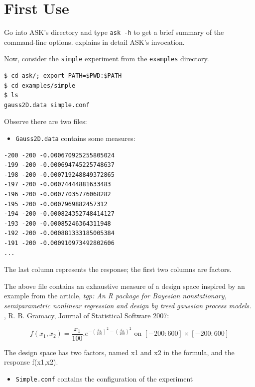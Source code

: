 \section{First Use}

Go into ASK's directory and type \texttt{ask -h} to get a brief summary of the command-line options.
 explains in detail ASK's invocation.

Now, consider the \texttt{simple} experiment from the \texttt{examples} directory.

\begin{verbatim}
$ cd ask/; export PATH=$PWD:$PATH
$ cd examples/simple
$ ls 
gauss2D.data simple.conf
\end{verbatim}

Observe there are two files:

\begin{itemize}
	\item \texttt{Gauss2D.data} contains some measures:
\end{itemize}

\begin{verbatim}
-200 -200 -0.000670925255805024
-199 -200 -0.000694745225748637
-198 -200 -0.000719248849372865
-197 -200 -0.00074444881633483
-196 -200 -0.00077035776068282
-195 -200 -0.0007969882457312
-194 -200 -0.000824352748414127
-193 -200 -0.00085246364311948
-192 -200 -0.000881333185005384
-191 -200 -0.000910973492802606
...
\end{verbatim}

The last column represents the response; the first two columns are factors.

The above file contains an exhaustive measure of a design space inspired by an example from the article, \emph{tgp: An R package for Bayesian nonstationary, semiparametric nonlinear regression and design by treed gaussian process models. }, R. B. Gramacy, Journal of Statistical Software 2007: 

$$
f(x_1,x_2) = \frac{x_1}{100}.e^{-(\frac{x_1}{100})^2-(\frac{x_2}{100})^2} \textrm{ on } [-200:600] \times [-200:600]
$$

The design space has two factors, named x1 and x2 in the formula, and the response f(x1,x2).

\begin{itemize}
	\item \texttt{Simple.conf} contains the configuration of the experiment
\end{itemize}

